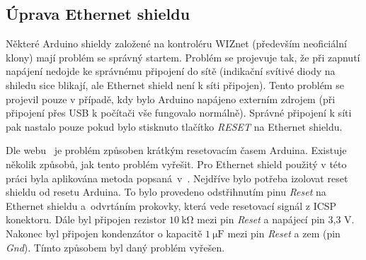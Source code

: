 \subsection{Úprava Ethernet shieldu}
\label{sec:ArdShiel_mod}
Některé Arduino shieldy založené na kontroléru WIZnet (především neoficiální klony) mají problém se správný startem. Problém se projevuje tak, že při zapnutí napájení nedojde ke správnému připojení do sítě (indikační svítivé diody na shiledu sice blikají, ale Ethernet shield není k síti připojen). Tento problém se projevil pouze v případě, kdy bylo Arduino napájeno externím zdrojem (při připojení přes USB k počítači vše fungovalo normálně). Správné připojení k síti pak nastalo pouze pokud bylo stisknuto tlačítko \textit{RESET} na Ethernet shieldu.

Dle webu~\cite{EthShieldError} je problém způsoben krátkým resetovacím časem Arduina. Existuje několik způsobů, jak tento problém vyřešit. Pro Ethernet shield použitý v této práci byla aplikována metoda popsaná~v~\cite{EthShieldModification}. Nejdříve bylo potřeba izolovat reset shieldu od resetu Arduina. To bylo provedeno odstřihnutím pinu \textit{Reset} na Ethernet shieldu a~odvrtáním prokovky, která vede resetovací signál z ICSP konektoru. Dále byl připojen rezistor $10 \ \mathrm{k\Omega}$ mezi pin \textit{Reset} a napájecí pin 3,3 V. Nakonec byl připojen kondenzátor o kapacitě $1 \ \mathrm{\mu F}$ mezi pin \textit{Reset} a zem (pin \textit{Gnd}). Tímto způsobem byl daný problém vyřešen.

